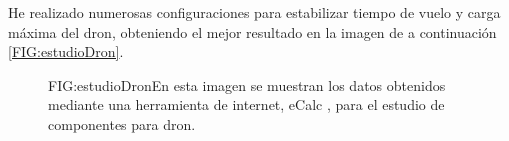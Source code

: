 
He realizado numerosas configuraciones para estabilizar tiempo de vuelo y carga máxima del dron, obteniendo el mejor resultado en la imagen de a continuación \ref{FIG:estudioDron}.
\begin{figure}[Estudio técnico de dron]{FIG:estudioDron}{En esta imagen se muestran los datos obtenidos mediante una herramienta de internet, eCalc \cite{DroneConfig}, para el estudio de componentes para dron.}
\end{figure}